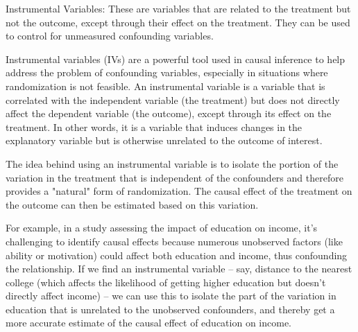 


Instrumental Variables: These are variables that are related to the treatment but not the outcome, except through their effect on the treatment. They can be used to control for unmeasured confounding variables.

Instrumental variables (IVs) are a powerful tool used in causal inference to help address the problem of confounding variables, especially in situations where randomization is not feasible. An instrumental variable is a variable that is correlated with the independent variable (the treatment) but does not directly affect the dependent variable (the outcome), except through its effect on the treatment. In other words, it is a variable that induces changes in the explanatory variable but is otherwise unrelated to the outcome of interest.

The idea behind using an instrumental variable is to isolate the portion of the variation in the treatment that is independent of the confounders and therefore provides a "natural" form of randomization. The causal effect of the treatment on the outcome can then be estimated based on this variation.

For example, in a study assessing the impact of education on income, it's challenging to identify causal effects because numerous unobserved factors (like ability or motivation) could affect both education and income, thus confounding the relationship. If we find an instrumental variable – say, distance to the nearest college (which affects the likelihood of getting higher education but doesn't directly affect income) – we can use this to isolate the part of the variation in education that is unrelated to the unobserved confounders, and thereby get a more accurate estimate of the causal effect of education on income.

